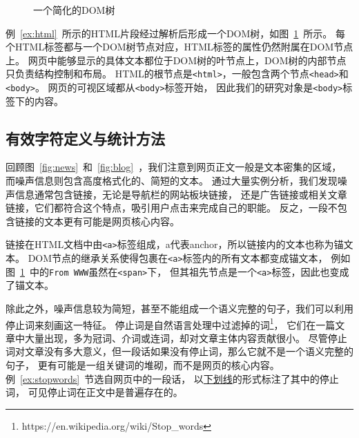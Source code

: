 \begin{figure}[htbp]
\centering
{}
\caption{一个简化的DOM树}
\label{fig:dom}
\end{figure}

例~\ref{ex:html}~所示的HTML片段经过解析后形成一个DOM树，如图~\ref{fig:dom}~所示。
每个HTML标签都与一个DOM树节点对应，HTML标签的属性仍然附属在DOM节点上。
网页中能够显示的具体文本都位于DOM树的叶节点上，DOM树的内部节点只负责结构控制和布局。
HTML的根节点是\texttt{<html>}，一般包含两个节点\texttt{<head>}和\texttt{<body>}。
网页的可视区域都从\texttt{<body>}标签开始，
因此我们的研究对象是\texttt{<body>}标签下的内容。

\subsection{有效字符定义与统计方法}
回顾图~\ref{fig:news}~和~\ref{fig:blog}~，我们注意到网页正文一般是文本密集的区域，
而噪声信息则包含高度格式化的、简短的文本。
通过大量实例分析，我们发现噪声信息通常包含链接，无论是导航栏的网站板块链接，
还是广告链接或相关文章链接，它们都符合这个特点，吸引用户点击来完成自己的职能。
反之，一段不包含链接的文本更有可能是网页核心内容。

链接在HTML文档中由\texttt{<a>}标签组成，a代表anchor，所以链接内的文本也称为锚文本。
DOM节点的继承关系使得包裹在\texttt{<a>}标签内的所有文本都变成锚文本，
例如图~\ref{fig:dom}~中的\texttt{From WWW}虽然在\texttt{<span>}下，
但其祖先节点是一个\texttt{<a>}标签，因此也变成了锚文本。

除此之外，噪声信息较为简短，甚至不能组成一个语义完整的句子，我们可以利用停止词来刻画这一特征。
停止词是自然语言处理中过滤掉的词\footnote{https://en.wikipedia.org/wiki/Stop\_words}，
它们在一篇文章中大量出现，多为冠词、介词或连词，却对文章主体内容贡献很小。
尽管停止词对文章没有多大意义，但一段话如果没有停止词，那么它就不是一个语义完整的句子，
更有可能是一组关键词的堆砌，而不是网页的核心内容。
例~\ref{ex:stopwords}~节选自网页中的一段话，
以\underline{下划线}的形式标注了其中的停止词，
可见停止词在正文中是普遍存在的。

